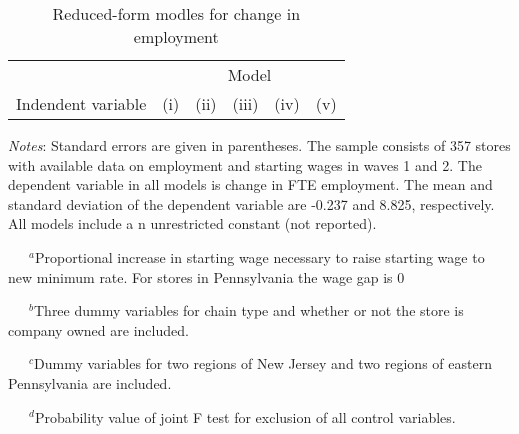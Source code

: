 \documentclass{article}
\begin{document}
\begin{table}[H]
	\centering
	\label{tab:Table}
		\begin{threeparttable}
			\caption{Reduced-form modles for change in employment}
			\begin{tabular}{@{}l*{5}{c}@{}}
				\toprule
				& \multicolumn{5}{c}{Model}								\\ \cmidrule(l){2-6}
				Indendent variable & (i) & (ii) & (iii) & (iv) & (v) 	\\ \midrule
				
				\bottomrule
			\end{tabular}
			\begin{tablenotes}
				\setlength{}
				\footnotesize
				\item \textit{Notes}: Standard errors are given in parentheses. 
				The sample consists of 357 stores with available data on employment and starting wages in waves 1 and 2. 
				The dependent variable in all models is change in FTE employment. The mean and standard deviation of 
				the dependent variable are -0.237 and 8.825, respectively. All models include a n unrestricted constant (not reported).
				\item ~~~$^{a}$Proportional increase in starting wage necessary to raise starting wage to new minimum rate. For stores in Pennsylvania the wage gap is 0
				\item ~~~$^{b}$Three dummy variables for chain type and whether or not the store is company owned are included.
				\item ~~~$^{c}$Dummy variables for two regions of New Jersey and two regions of eastern Pennsylvania are included.
				\item ~~~$^{d}$Probability value of joint F test for exclusion of all control variables.
			\end{tablenotes}
		\end{threeparttable}
\end{table}
\end{document}
